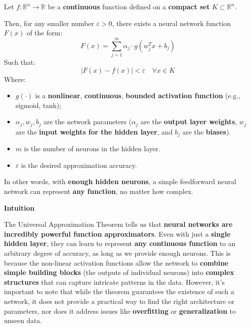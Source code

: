 \begin{theorem}\label{thm:universal-approximation-theorem}
    Let $f : \mathbb{R}^{n} \rightarrow \mathbb{R}$ be a \textbf{continuous} function defined on a \textbf{compact set} $K \subset \mathbb{R}^{n}$.

    \highspace
    Then, for any smaller number $\varepsilon > 0$, there exists a neural network function $F(x)$ of the form:
    \begin{equation}
        F(x) = \displaystyle\sum_{j=1}^{m} \alpha_{j} \cdot g\left(w_{j}^{T} x + b_{j}\right)
    \end{equation}
    Such that:
    \begin{equation}
        \left| F(x) - f(x) \right| < \varepsilon \quad \forall x \in K
    \end{equation}
    Where:
    \begin{itemize}
        \item $g\left(\cdot\right)$ is a \textbf{nonlinear}, \textbf{continuous}, \textbf{bounded activation function} (e.g., sigmoid, tanh);
        \item $\alpha_{j}, w_{j}, b_{j}$ are the network parameters ($\alpha_{j}$ are the \textbf{output layer weights}, $w_{j}$ are the \textbf{input weights for the hidden layer}, and $b_{j}$ are the \textbf{biases}).
        \item $m$ is the number of neurons in the hidden layer.
        \item $\varepsilon$ is the desired approximation accuracy.
    \end{itemize}
    In other words, with \textbf{enough hidden neurons}, a simple feedforward neural network can represent \textbf{any function}, no matter how complex.
\end{theorem}

\highspace
\begin{flushleft}
    \textcolor{Green3}{ \textbf{Intuition}}
\end{flushleft}
The Universal Approximation Theorem tells us that \textbf{neural networks are incredibly powerful function approximators}. Even with just a \textbf{single hidden layer}, they can learn to represent \textbf{any continuous function} to an arbitrary degree of accuracy, as long as we provide enough neurons. This is because the non-linear activation functions allow the network to \textbf{combine simple building blocks} (the outputs of individual neurons) into \textbf{complex structures} that can capture intricate patterns in the data. However, it's important to note that while the theorem guarantees the existence of such a network, it does not provide a practical way to find the right architecture or parameters, nor does it address issues like \textbf{overfitting} or \textbf{generalization} to unseen data.

